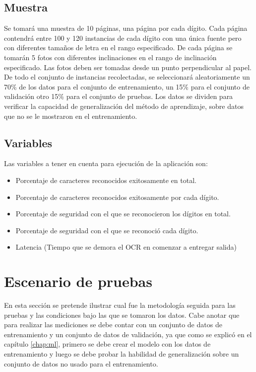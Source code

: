 \documentclass[a4paper, 11pt, oneside]{report}
\begin{document}
	\subsection{Muestra}
	Se tomará una muestra de 10 páginas, una página por cada dígito. Cada página contendrá entre 100 y 120 instancias de cada dígito con una única fuente pero con diferentes tamaños de letra en el rango especificado. De cada página se tomarán 5 fotos con diferentes inclinaciones en el rango de inclinación especificado. Las fotos deben ser tomadas desde un punto perpendicular al papel. De todo el conjunto de instancias recolectadas, se seleccionará aleatoriamente un 70\% de los datos para el conjunto de entrenamiento, un 15\% para el conjunto de validación otro 15\% para el conjunto de pruebas. Los datos se dividen para verificar la capacidad de generalización del método de aprendizaje, sobre datos que no se le mostraron en el entrenamiento.
	
	\subsection{Variables}
	Las variables a tener en cuenta para ejecución de la aplicación son:
	\begin{itemize}
	\item Porcentaje de caracteres reconocidos exitosamente en total.
	\item Porcentaje de caracteres reconocidos exitosamente por cada dígito.
	\item Porcentaje de seguridad con el que se reconocieron los dígitos en total.
	\item Porcentaje de seguridad con el que se reconoció cada dígito.
	\item Latencia (Tiempo que se demora el OCR en comenzar a entregar salida)
	\end{itemize}

\section{Escenario de pruebas}
En esta sección se pretende ilustrar cual fue la metodología seguida para las pruebas y las condiciones bajo las que se tomaron los datos. Cabe anotar que para realizar las mediciones se debe contar con un conjunto de datos de entrenamiento y un conjunto de datos de validación, ya que como se explicó en el capítulo \ref{chap:ml}, primero se debe crear el modelo con los datos de entrenamiento y luego se debe probar la habilidad de generalización sobre un conjunto de datos no usado para el entrenamiento.
\end{document}
